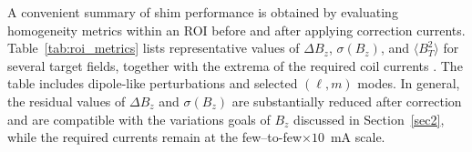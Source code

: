 \documentclass[preprint,12pt]{elsarticle}
\begin{document}
A convenient summary of shim performance is obtained by evaluating homogeneity metrics within an ROI before and after applying correction currents. Table~\ref{tab:roi_metrics} lists representative values of $\Delta B_z$, $\sigma(B_z)$, and $\langle B_T^2\rangle$ for several target fields, together with the extrema of the required coil currents \cite{bib:katotoka2025}. The table includes dipole-like perturbations and selected $(\ell,m)$ modes. In general, the residual values of $\Delta B_z$ and $\sigma(B_z)$ are substantially reduced after correction and are compatible with the variations goals of $B_z$ discussed in Section~\ref{sec2}, while the required currents remain at the few--to-few$\times10$~mA scale.

\begin{table}[tbp]
\centering
\scriptsize
\setlength{\tabcolsep}{3pt}
\renewcommand{\arraystretch}{1.05}
\end{table}
\end{document}
